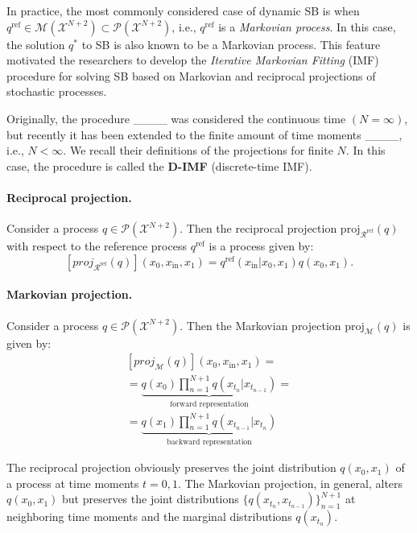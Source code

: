In practice, the most commonly considered case of dynamic SB is when $q^{\text{ref}}\in\mathcal{M}(\mathcal{X}^{N+2})\subset \mathcal{P}(\mathcal{X}^{N+2})$, i.e., $q^{\text{ref}}$ is a \textit{Markovian process}. In this case, the solution $q^{*}$ to SB is also known to be a Markovian process. This feature motivated the researchers to develop the \textit{Iterative Markovian Fitting} (IMF) procedure for solving SB based on Markovian and reciprocal projections of stochastic processes.

Originally, the procedure ____ was considered the continuous time $(N=\infty)$, but recently it has been extended to the finite amount of time moments ____, i.e., $N<\infty$. We recall their definitions of the projections for finite $N$. In this case, the procedure is called the \textbf{D-IMF} (discrete-time IMF).

\paragraph{Reciprocal projection.} Consider a process $q\!\in\! \mathcal{P}(\mathcal{X}^{N+2})$. Then the reciprocal projection $\text{proj}_{\mathcal{R}^{\text{ref}}}(q)$ with respect to the reference process $q^{\text{ref}}$ is a process given by:
\begin{equation}
    \label{eq:recip_proj}
    \left[proj_{\mathcal{R}^{\text{ref}}}(q)\right](x_0, x_{\text{in}}, x_1) = q^{\text{ref}}(x_{\text{in}}| x_0, x_1)q(x_0, x_1)
    \nonumber.
\end{equation}

\paragraph{Markovian projection.} Consider a process ${q\!\in \!\mathcal{P}(\mathcal{X}^{N+2})}$. Then the Markovian projection $\text{proj}_{\mathcal{M}}(q)$ is given by:
\begin{multline}
    \left[proj_{\mathcal{M}}(q)\right](x_0, x_{\text{in}}, x_1) = \\ = \underbrace{q(x_0)\prod_{n=1}^{N+1}q(x_{t_{n}}|x_{t_{n-1}})}_{\text{forward representation}} = \\ = \underbrace{q(x_1)\prod_{n=1}^{N+1}q(x_{t_{n-1}}|x_{t_{n}})}_{\text{backward representation}}
    \label{eq:markov_proj}
\end{multline}

The reciprocal projection obviously preserves the joint distribution $q(x_0,x_1)$ of a process at time moments $t=0,1$. The Markovian projection, in general, alters $q(x_0,x_1)$ but preserves the joint distributions $\{q(x_{t_n},x_{t_{n-1}})\}_{n=1}^{N+1}$ at neighboring time moments and the marginal distributions $q(x_{t_{n}})$.

